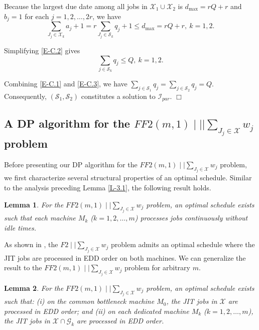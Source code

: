 \documentclass[12pt, eqno, limlimits]{article}
\newtheorem{lemma}{Lemma}[section]
\begin{document}
\begin{sloppypar}
        Because the largest due date among all jobs in $\mathcal{X}_1 \cup \mathcal{X}_2$ is $d_{\max}=rQ+r$ and $b_j=1$ for each $j=1, 2, \ldots, 2r$, we have 
        \begin{equation}\label{E-C.2}
            \sum_{J_j \in \mathcal{X}_k} a_j+1 = r \sum_{J_j \in \mathcal{S}_k} q_j+1 \leq d_{\max}= rQ+r, ~ k=1, 2.
        \end{equation}
        
        Simplifying \eqref{E-C.2} gives 
        \begin{equation}\label{E-C.3}
            \sum_{j \in \mathcal{S}_k} q_j \leq Q, ~ k=1, 2.
        \end{equation}
        
        Combining \eqref{E-C.1} and \eqref{E-C.3}, we have $\sum_{j \in \mathcal{S}_1} q_j = \sum_{j \in \mathcal{S}_2} q_j=Q$. Consequently, $(\mathcal{S}_1, \mathcal{S}_2)$ constitutes a solution to $\mathcal{I}_{par}$. \hfill$\Box$ 
        
        \subsection{A DP algorithm for the $FF2(m, 1) \mid \mid |\sum_{J_j \in \mathcal{X}} w_j$ problem}
        
        Before presenting our DP algorithm for the $FF2(m, 1)\mid \mid \sum_{J_j \in \mathcal{X}} w_j$ problem, we first characterize several structural properties of an optimal schedule. Similar to the analysis preceding Lemma \ref{L-3.1}, the following result holds.
        
        \begin{lemma} \label{L-4.1}
            For the $FF2(m, 1)\mid \mid \sum_{J_j \in \mathcal{X}} w_j$ problem, an optimal schedule exists such that each machine $M_k$ ($k=1, 2, \ldots, m$) processes jobs continuously without idle times.
        \end{lemma}
        
        As shown in \cite{ChoiYoon2007JOS}, the $F2\mid \mid \sum_{J_j \in \mathcal{X}} w_j$ problem admits an optimal schedule where the JIT jobs are processed in EDD order on both machines. We can generalize the result to the $FF2(m, 1)\mid \mid \sum_{J_j \in \mathcal{X}} w_j$ problem for arbitrary $m$.
        
        \begin{lemma} \label{L-4.2}
            For the $FF2(m, 1)\mid \mid \sum_{J_j \in \mathcal{X}} w_j$ problem, an optimal schedule exists such that: (i) on the common bottleneck machine $M_0$, the JIT jobs in $\mathcal{X}$ are processed in EDD order; and (ii) on each dedicated machine $M_k$ ($k=1, 2, \ldots, m$), the JIT jobs in $\mathcal{X} \cap \mathcal{G}_k$ are processed in EDD order.
        \end{lemma}
        

\end{sloppypar}
\end{document}
